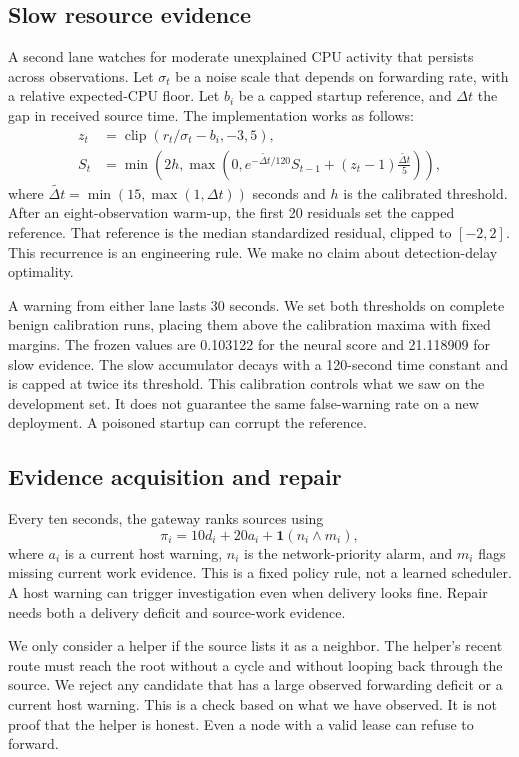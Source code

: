 \documentclass[journal]{IEEEtran}
\begin{document}
\subsection{Slow resource evidence}
A second lane watches for moderate unexplained CPU activity that persists across observations. Let $\sigma_t$ be a noise scale that depends on forwarding rate, with a relative expected-CPU floor. Let $b_i$ be a capped startup reference, and $\Delta t$ the gap in received source time. The implementation works as follows:
\begin{align}
z_t &= \operatorname{clip}(r_t/\sigma_t-b_i,-3,5),\\
S_t &= \min\!\left(2h,\max\!\left(0,e^{-\widetilde{\Delta t}/120}S_{t-1}
 +(z_t-1)\frac{\widetilde{\Delta t}}{5}\right)\right),
\end{align}
where $\widetilde{\Delta t}=\min(15,\max(1,\Delta t))$ seconds and $h$ is the calibrated threshold. After an eight-observation warm-up, the first 20 residuals set the capped reference. That reference is the median standardized residual, clipped to $[-2,2]$. This recurrence is an engineering rule. We make no claim about detection-delay optimality.

A warning from either lane lasts 30 seconds. We set both thresholds on complete benign calibration runs, placing them above the calibration maxima with fixed margins. The frozen values are 0.103122 for the neural score and 21.118909 for slow evidence. The slow accumulator decays with a 120-second time constant and is capped at twice its threshold. This calibration controls what we saw on the development set. It does not guarantee the same false-warning rate on a new deployment. A poisoned startup can corrupt the reference.

\subsection{Evidence acquisition and repair}
Every ten seconds, the gateway ranks sources using
\begin{equation}
\pi_i=10d_i+20a_i+\mathbf{1}(n_i\land m_i),
\end{equation}
where $a_i$ is a current host warning, $n_i$ is the network-priority alarm, and $m_i$ flags missing current work evidence. This is a fixed policy rule, not a learned scheduler. A host warning can trigger investigation even when delivery looks fine. Repair needs both a delivery deficit and source-work evidence.

We only consider a helper if the source lists it as a neighbor. The helper's recent route must reach the root without a cycle and without looping back through the source. We reject any candidate that has a large observed forwarding deficit or a current host warning. This is a check based on what we have observed. It is not proof that the helper is honest. Even a node with a valid lease can refuse to forward.
\end{document}
